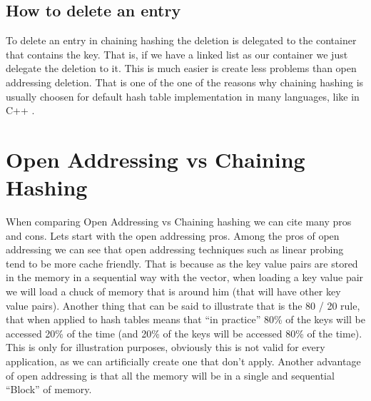 \subsection{How to delete an entry}

To delete an entry in chaining hashing the deletion is delegated to the container that contains the key. That is, if we have a linked list as our container we just delegate the deletion to it. This is much easier is create less problems than open addressing deletion. That is one of the one of the reasons why chaining hashing is usually choosen for default hash table implementation in many languages, like in C++ \citep{UnorderedMapDiscussion}.

\section{Open Addressing vs Chaining Hashing}

When comparing Open Addressing vs Chaining hashing we can cite many pros and cons. Lets start with the open addressing pros. Among the pros of open addressing we can see that open addressing techniques such as linear probing tend to be more cache friendly. That is because as the key value pairs are stored in the memory in a sequential way with the vector, when loading a key value pair we will load a chuck of memory that is around him (that will have other key value pairs). Another thing that can be said to illustrate that is the 80 / 20 rule, that when applied to hash tables means that ``in practice'' 80\% of the keys will be accessed 20\% of the time (and 20\% of the keys will be accessed 80\% of the time). This is only for illustration purposes, obviously this is not valid for every application, as we can artificially create one that don't apply. Another advantage of open addressing is that all the memory will be in a single and sequential ``Block'' of memory. 